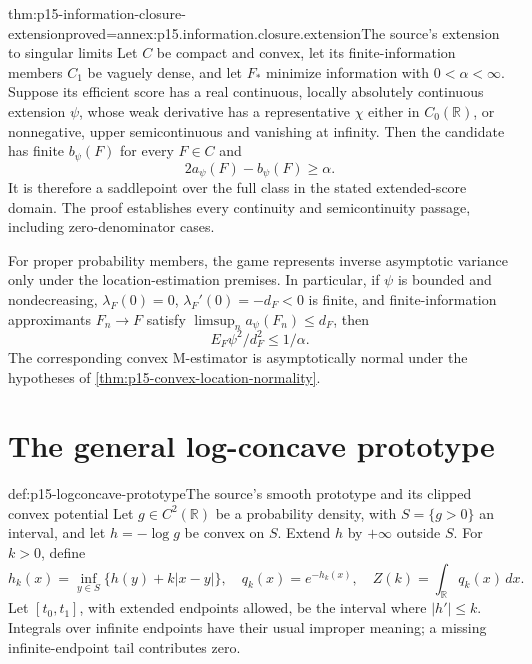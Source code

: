 \begin{hbtheorem}{thm:p15-information-closure-extension}{proved=annex:p15.information.closure.extension}{The source's extension to singular limits}
Let \(C\) be compact and convex, let its finite-information members
\(C_1\) be vaguely dense, and let \(F_*\) minimize information
with \(0<\alpha<\infty\).
Suppose its efficient score has a real continuous, locally absolutely
continuous extension \(\psi\), whose weak derivative has a representative
\(\chi\) either in \(C_0(\mathbb R)\), or nonnegative, upper
semicontinuous and vanishing at infinity.
Then the candidate has finite \(b_\psi(F)\) for every \(F\in C\) and
\[
                  2a_\psi(F)-b_\psi(F)\geq\alpha .
\]
It is therefore a saddlepoint over the full class in the stated
extended-score domain. The proof establishes every continuity and
semicontinuity passage, including zero-denominator cases.

For proper probability members, the game represents inverse asymptotic
variance only under the location-estimation premises.
In particular, if \(\psi\) is bounded and nondecreasing,
\(\lambda_F(0)=0\), \(\lambda_F'(0)=-d_F<0\) is finite, and
finite-information approximants \(F_n\to F\) satisfy
\(\limsup_n a_\psi(F_n)\leq d_F\), then
\[
 E_F\psi^2/d_F^2\leq1/\alpha .
\]
The corresponding convex M-estimator is asymptotically normal under
the hypotheses of \cref{thm:p15-convex-location-normality}.
\end{hbtheorem}

\section{The general log-concave prototype}
\label{sec:p15-huber-general-prototype}

\begin{hbdefinition}{def:p15-logconcave-prototype}{The source's smooth prototype and its clipped convex potential}
Let \(g\in C^2(\mathbb R)\) be a probability density, with
\(S=\{g>0\}\) an interval, and let \(h=-\log g\) be convex on \(S\).
Extend \(h\) by \(+\infty\) outside \(S\).
For \(k>0\), define
\[
 h_k(x)=\inf_{y\in S}\{h(y)+k|x-y|\},\quad
 q_k(x)=e^{-h_k(x)},\quad Z(k)=\int_{\mathbb R}q_k(x)\,dx.
\]
Let \([t_0,t_1]\), with extended endpoints allowed, be the interval
where \(|h'|\leq k\). Integrals over infinite endpoints have their
usual improper meaning; a missing infinite-endpoint tail contributes zero.
\end{hbdefinition}

